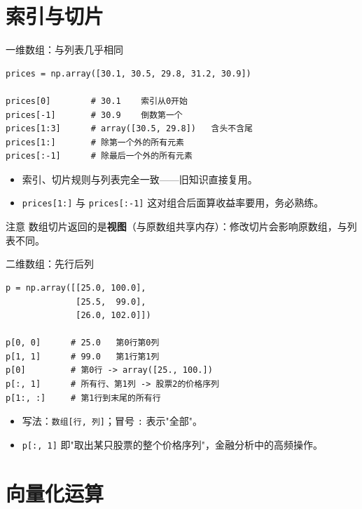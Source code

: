 \documentclass[9pt]{ctexbeamer}
\begin{document}
\section{索引与切片}

\begin{frame}[fragile]{一维数组：与列表几乎相同}
	\begin{lstlisting}
prices = np.array([30.1, 30.5, 29.8, 31.2, 30.9])

prices[0]        # 30.1    索引从0开始
prices[-1]       # 30.9    倒数第一个
prices[1:3]      # array([30.5, 29.8])   含头不含尾
prices[1:]       # 除第一个外的所有元素
prices[:-1]      # 除最后一个外的所有元素
\end{lstlisting}
	\begin{itemize}
		\item 索引、切片规则与列表完全一致——旧知识直接复用。
		\item \texttt{prices[1:]} 与 \texttt{prices[:-1]} 这对组合后面算收益率要用，务必熟练。
	\end{itemize}
	\begin{alertblock}{注意}
		数组切片返回的是\textbf{视图}（与原数组共享内存）：修改切片会影响原数组，与列表不同。
	\end{alertblock}
\end{frame}

\begin{frame}[fragile]{二维数组：先行后列}
	\begin{lstlisting}
p = np.array([[25.0, 100.0],
              [25.5,  99.0],
              [26.0, 102.0]])

p[0, 0]      # 25.0   第0行第0列
p[1, 1]      # 99.0   第1行第1列
p[0]         # 第0行 -> array([25., 100.])
p[:, 1]      # 所有行、第1列 -> 股票2的价格序列
p[1:, :]     # 第1行到末尾的所有行
\end{lstlisting}
	\begin{itemize}
		\item 写法：\texttt{数组[行, 列]}；冒号 \texttt{:} 表示"全部"。
		\item \texttt{p[:, 1]} 即"取出某只股票的整个价格序列"，金融分析中的高频操作。
	\end{itemize}
\end{frame}


\section{向量化运算}
\end{document}
